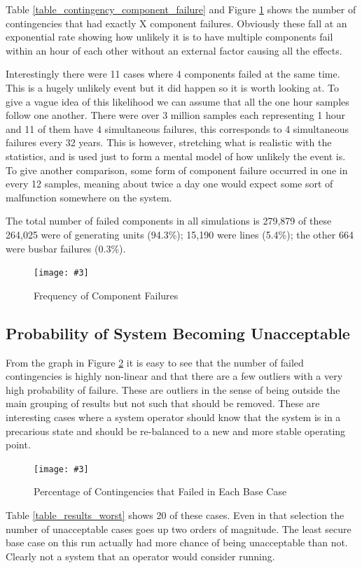 \documentclass[a4paper,oneside,12pt]{report}
\newcommand{\image}[3] {
  \begin{figure}
    \begin{center}
      \texttt{[image: \#3]}
      \caption{#2}
      \label{#1}
    \end{center}
  \end{figure}
}
\begin{document}
Table \ref{table_contingency_component_failure} and Figure \ref{contingencyfailfreq} shows the number of contingencies that had exactly X component failures. Obviously these fall at an exponential rate showing how unlikely it is to have multiple components fail within an hour of each other without an external factor causing all the effects. 

Interestingly there were 11 cases where 4 components failed at the same time. This is a hugely unlikely event but it did happen so it is worth looking at. To give a vague idea of this likelihood we can assume that all the one hour samples follow one another. There were over 3 million samples each representing 1 hour and 11 of them have 4 simultaneous failures, this corresponds to 4 simultaneous failures every 32 years. This is however, stretching what is realistic with the statistics, and is used just to form a mental model of how unlikely the event is. To give another comparison, some form of component failure occurred in one in every 12 samples, meaning about twice a day one would expect some sort of malfunction somewhere on the system.

The total number of failed components in all simulations is 279,879 of these 264,025 were of generating units (94.3\%); 15,190 were lines (5.4\%); the other 664 were busbar failures (0.3\%). 

\image{contingencyfailfreq}{Frequency of Component Failures}{contingencyfailfreq.png}

\subsection{Probability of System Becoming Unacceptable}

From the graph in Figure \ref{probacceptable} it is easy to see that the number of failed contingencies is highly non-linear and that there are a few outliers with a very high probability of failure. These are outliers in the sense of being outside the main grouping of results but not such that should be removed. These are interesting cases where a system operator should know that the system is in a precarious state and should be re-balanced to a new and more stable operating point.

\image{probacceptable}{Percentage of Contingencies that Failed in Each Base Case}{probacceptable.png}

Table \ref{table_results_worst} shows 20 of these cases. Even in that selection the number of unacceptable cases goes up two orders of magnitude. The least secure base case on this run actually had more chance of being unacceptable than not. Clearly not a system that an operator would consider running.
\end{document}
